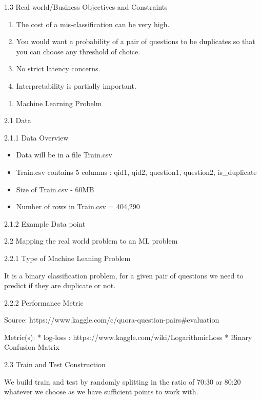 \documentclass[11pt]{article}
\providecommand{\tightlist}{%
      \setlength{\itemsep}{0pt}\setlength{\parskip}{0pt}}
\begin{document}
    1.3 Real world/Business Objectives and Constraints

    \begin{enumerate}
\def\labelenumi{\arabic{enumi}.}
\tightlist
\item
  The cost of a mis-classification can be very high.
\item
  You would want a probability of a pair of questions to be duplicates
  so that you can choose any threshold of choice.
\item
  No strict latency concerns.
\item
  Interpretability is partially important.
\end{enumerate}

    \begin{enumerate}
\def\labelenumi{\arabic{enumi}.}
\setcounter{enumi}{1}
\tightlist
\item
  Machine Learning Probelm
\end{enumerate}

    2.1 Data

    2.1.1 Data Overview

    \begin{itemize}
\tightlist
\item
  Data will be in a file Train.csv 
\item
  Train.csv contains 5 columns : qid1, qid2, question1, question2,
  is\_duplicate 
\item
  Size of Train.csv - 60MB 
\item
  Number of rows in Train.csv = 404,290
\end{itemize}

    2.1.2 Example Data point

    

    2.2 Mapping the real world problem to an ML problem

    2.2.1 Type of Machine Leaning Problem

    It is a binary classification problem, for a given pair of questions we
need to predict if they are duplicate or not.

    2.2.2 Performance Metric

    Source: https://www.kaggle.com/c/quora-question-pairs\#evaluation

Metric(s): * log-loss : https://www.kaggle.com/wiki/LogarithmicLoss *
Binary Confusion Matrix

    2.3 Train and Test Construction

    We build train and test by randomly splitting in the ratio of 70:30 or
80:20 whatever we choose as we have sufficient points to work with.
\end{document}
